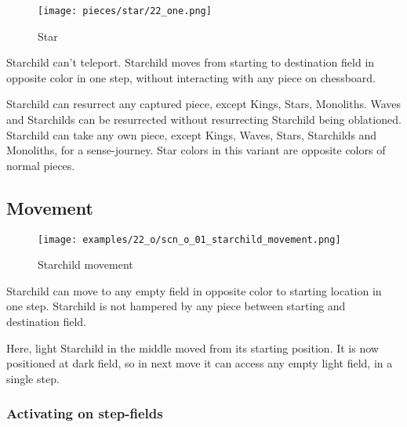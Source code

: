 \noindent
\begin{wrapfigure}[11]{l}{0.4\textwidth}
\centering
\texttt{[image: pieces/star/22\_one.png]}
\caption{Star}
\label{fig:star/22_one}
\end{wrapfigure}
Starchild can't teleport. Starchild moves from starting to destination field in
opposite color in one step, without interacting with any piece on chessboard.

Starchild can resurrect any captured piece, except Kings, Stars, Monoliths. Waves
and Starchilds can be resurrected without resurrecting Starchild being oblationed.
Starchild can take any own piece, except Kings, Waves, Stars, Starchilds and
Monoliths, for a sense-journey. \newline
\indent
Star colors in this variant are opposite colors of normal pieces.

\clearpage %

\subsection*{Movement}
\label{sec:One/Starchild/Movement}

\vspace*{-1.1\baselineskip}
\noindent
\begin{figure}[!h]
\texttt{[image: examples/22\_o/scn\_o\_01\_starchild\_movement.png]}
\caption{Starchild movement}
\label{fig:scn_o_01_starchild_movement}
\end{figure}

Starchild can move to any empty field in opposite color to starting location in
one step. Starchild is not hampered by any piece between starting and destination
field.

Here, light Starchild in the middle moved from its starting position. It is now
positioned at dark field, so in next move it can access any empty light field, in
a single step.

\clearpage %

\subsubsection*{Activating on step-fields}
\label{sec:One/Starchild/Movement/Activating on step-fields}

